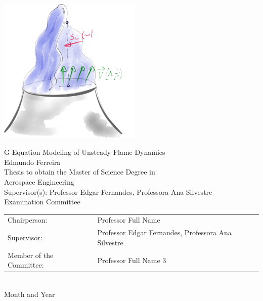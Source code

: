 \begin{center}
%
\vspace{1.6cm}
\includegraphics[height=70mm]{img/aguarela2.png}

\vspace{1.0cm}
{\FontLb G-Equation Modeling of Unsteady Flame Dynamics} \\
\vspace{2.0cm}
{\FontMb Edmundo Ferreira} \\
\vspace{2.0cm}
{\FontSn Thesis to obtain the Master of Science Degree in} \\
\vspace{0.3cm}
{\FontLb Aerospace Engineering} \\
\vspace{1.1cm}
{\FontSn Supervisor(s): Professor Edgar Fernandes, Professora Ana Silvestre} \\
\vspace{1.1cm}
{\FontMb Examination Committee} \\
\vspace{0.3cm}
{\FontSn %
\begin{tabular}{ll}
Chairperson: & Professor Full Name \\
Supervisor: & Professor Edgar Fernandes, Professora Ana Silvestre \\
Member of the Committee: & Professor Full Name 3
\end{tabular} } \\
\vspace{1.5cm}
{\FontMb Month and Year} \\
%
\end{center}

\cleardoublepage

